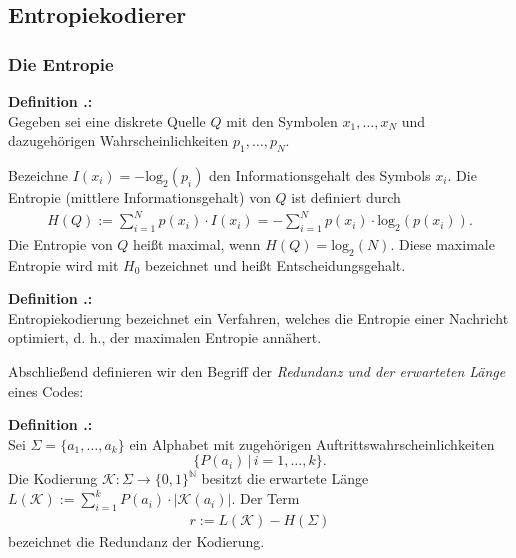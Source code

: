 \documentclass[a4paper,12pt]{article}
\newcommand{\N}{\mathbb N}
\newcounter{Definition}
\newenvironment{Definition}{
\bigskip
        
        \setlength{\parindent}{0pt}
        \addtocounter{Definition}{1}
        \textbf{\textsf{Definition \thesubsection.\theDefinition}:}\\}{
        \nopagebreak
        \vspace{-1.0ex}
        \bigskip
        
}
\begin{document}
\subsection{Entropiekodierer}
\subsubsection{Die Entropie}
\begin{Definition}
Gegeben sei eine diskrete Quelle $Q$ mit den Symbolen $x_{1},\ldots,x_{N}$ und dazugehörigen Wahrscheinlichkeiten $p_1,\ldots,p_N$.
\par
Bezeichne $I(x_{i}) = -\text{log}_{2}(p_{i})$ den Informationsgehalt des Symbols $x_{i}$.
Die Entropie (mittlere Informationsgehalt) von $Q$ ist definiert durch
\begin{align*}
H(Q):=\sum_{i=1}^N p(x_{i})\cdot I(x_{i}) =- \sum_{i=1}^N p(x_{i}) \cdot \text{log}_2(p(x_{i})).
\end{align*}
Die Entropie von $Q$ heißt maximal, wenn $H(Q) = \text{log}_2(N)$.
 Diese maximale Entropie wird mit $H_{0}$ bezeichnet und heißt Entscheidungsgehalt.
\end{Definition}
\begin{Definition}
Entropiekodierung bezeichnet ein Verfahren, welches die Entropie einer Nachricht optimiert, d. h., der maximalen Entropie annähert.
\end{Definition}
Abschließend definieren wir den Begriff der  {\it Redundanz und der erwarteten Länge} eines Codes:
\begin{Definition}
Sei $\Sigma = \{a_{1},\ldots, a_{k}\}$ ein Alphabet mit zugehörigen Auftrittswahrscheinlichkeiten 
$$
\{P(a_{i})\,|\,i=1,\ldots,k\}.
$$
Die Kodierung $\mathcal{K}: \Sigma\rightarrow \{0, 1\}^{\N}$ besitzt die erwartete Länge
$
L(\mathcal{K}):=\sum_{i=1}^{k} P(a_{i})\cdot \left| \mathcal{K}(a_{i})\right|.
$
Der Term 
\begin{align*}
r:=L(\mathcal{K}) - H(\Sigma)
\end{align*}
bezeichnet die Redundanz der Kodierung.
\end{Definition}
\end{document}
